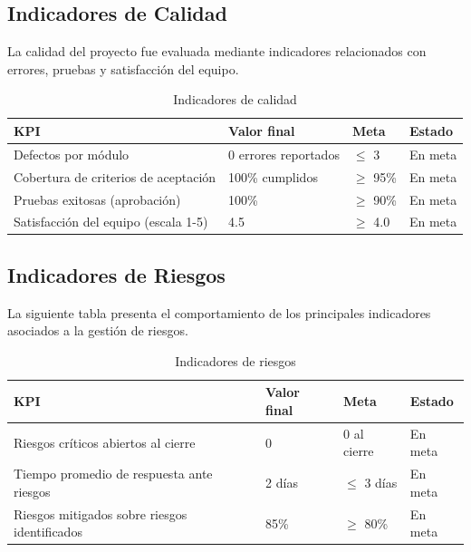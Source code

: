 \documentclass[11pt,spanish]{article}
\begin{document}
\subsection{Indicadores de Calidad}

La calidad del proyecto fue evaluada mediante indicadores relacionados con
errores, pruebas y satisfacción del equipo.

\begin{table}[H]
\centering
\caption{Indicadores de calidad}
\label{tab:kpi-calidad}
\begin{tabularx}{\textwidth}{Yp{3cm}p{2.5cm}p{2.5cm}}
\toprule
\textbf{KPI} &
\textbf{Valor final} &
\textbf{Meta} &
\textbf{Estado} \\
\midrule

Defectos por módulo &
0 errores reportados &
$\leq$ 3 &
En meta
\\

Cobertura de criterios de aceptación &
100\% cumplidos &
$\geq$ 95\% &
En meta
\\

Pruebas exitosas (aprobación) &
100\% &
$\geq$ 90\% &
En meta
\\

Satisfacción del equipo (escala 1-5) &
4.5 &
$\geq$ 4.0 &
En meta
\\

\bottomrule
\end{tabularx}
\end{table}

\subsection{Indicadores de Riesgos}

La siguiente tabla presenta el comportamiento de los principales indicadores
asociados a la gestión de riesgos.

\begin{table}[H]
\centering
\caption{Indicadores de riesgos}
\label{tab:kpi-riesgos}
\begin{tabularx}{\textwidth}{Yp{3cm}p{2.5cm}p{2.5cm}}
\toprule
\textbf{KPI} &
\textbf{Valor final} &
\textbf{Meta} &
\textbf{Estado} \\
\midrule

Riesgos críticos abiertos al cierre &
0 &
0 al cierre &
En meta
\\

Tiempo promedio de respuesta ante riesgos &
2 días &
$\leq$ 3 días &
En meta
\\

Riesgos mitigados sobre riesgos identificados &
85\% &
$\geq$ 80\% &
En meta
\\

\bottomrule
\end{tabularx}
\end{table}
\end{document}
